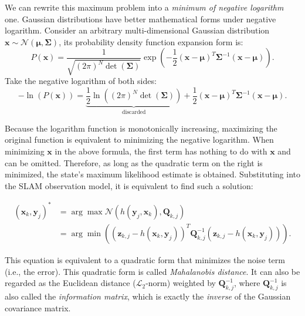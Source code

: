 We can rewrite this maximum problem into a \textit{minimum of negative logarithm} one. Gaussian distributions have better mathematical forms under negative logarithm. Consider an arbitrary multi-dimensional Gaussian distribution $\mathbf{x} \sim \mathcal{N}(\mathbf{\mu}, \boldsymbol{\Sigma})$, its probability density function expansion form is:
\begin{equation}
	P\left( \mathbf{x} \right) = \frac{1}{{\sqrt {{{(2\pi )}^N}\det (\boldsymbol{\Sigma} )} }}\exp \left( {-\frac{1}{2}{{\left( {\mathbf{x}-\mathbf{\mu}} \right)}^T}{ \boldsymbol{\Sigma} ^ {-1}}\left( {\mathbf{x}-\mathbf{\mu}} \right)} \right).
\end{equation}
Take the negative logarithm of both sides:
\begin{equation}
	-\ln \left( {P\left( \mathbf{x} \right)} \right) = \underbrace{\frac{1}{2}\ln \left( {{{\left( {2\pi} \right )}^N}\det \left( \boldsymbol{\Sigma} \right)} \right)}_{\text{discarded}} + \frac{1}{2}{\left( {\mathbf{x}-\mathbf{\mu}} \right)^T}{\boldsymbol{\Sigma} ^{-1}}\left( {\mathbf{x}-\mathbf{\mu}} \right).
\end{equation}

Because the logarithm function is monotonically increasing, maximizing the original function is equivalent to minimizing the negative logarithm. When minimizing $\mathbf{x}$ in the above formula, the first term has nothing to do with $\mathbf{x}$ and can be omitted. Therefore, as long as the quadratic term on the right is minimized, the state's maximum likelihood estimate is obtained. Substituting into the SLAM observation model, it is equivalent to find such a solution:

\begin{equation}
	\begin{aligned}
		(\mathbf{x}_k,\mathbf{y}_j)^* &= \arg \max \mathcal{N}(h(\mathbf{y}_j, \mathbf{x}_k), \mathbf{Q }_{k,j}) \\ &= \arg \min \left( {{{\left( {{ \mathbf{z}_{k,j}}-h\left( {{\mathbf{x }_k},{\mathbf{y}_j}} \right)} \right)}^T} \mathbf{Q}_{k,j}^{-1}\left( {{\mathbf{z}_{k,j}}-h\left( {{\mathbf{x}_k},{\mathbf{y}_j}} \right)} \right)} \right).
	\end{aligned}
\end{equation}

This equation is equivalent to a quadratic form that minimizes the noise term (i.e., the error). This quadratic form is called \textit{Mahalanobis distance}. It can also be regarded as the Euclidean distance ($\mathcal{L}_2$-norm) weighted by $\mathbf{Q}_{k,j}^{-1}$, where $\mathbf{Q}_{k,j} ^{-1}$ is also called the \textit{information matrix}, which is exactly the \textit{inverse} of the Gaussian covariance matrix.

